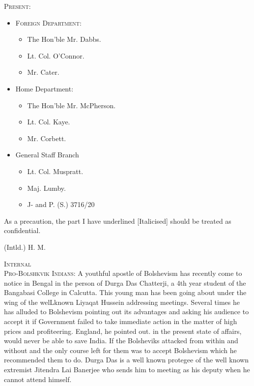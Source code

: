 \begin{center}
\textsc{Present:} 
\begin{itemize}
    
    \item \textsc{Foreign Department:}
    \begin{itemize}
     \item The Hon'ble Mr. Dabbs. 
     \item Lt. Col. O'Connor.
     \item Mr. Cater. 
    \end{itemize}
    

    
   \item  Home Department:
   \begin{itemize}
     \item The Hon’ble Mr. McPherson.
     \item Lt. Col. Kaye.
     \item Mr. Corbett. 
    \end{itemize}
    
    \item General Staff Branch
    \begin{itemize}
     \item Lt. Col. Muspratt. 
     \item Maj. Lumby. 
     \item J- and P. (S.) 3716/20 
    \end{itemize}
    
    \end{itemize}

\end{center}

As a precaution, the part I have underlined [Italicised] should be treated as confidential. 
\begin{flushright}
(Intld.) H. M. 
\end{flushright}
    
\textsc{Internal}\\

\textsc{Pro-Bolshkvik Indians:} A youthful apostle of Bolshevism has recently come to notice in Bengal in the person of Durga 
Das Chatterji, a 4th year student of the Bangabasi College in Calcutta. This young man has been going about under the wing of the welLknown Liyaqat Hussein addressing meetings. Several times he has alluded to Bolshevism pointing out its advantages and asking his audience to accept it if Government failed to take immediate action in the matter of high prices and profiteering. England, he pointed out. in the present state of affairs, would never be able to save India. If the Bolsheviks attacked from within and without and the only course left for them was to accept Bolshevism which he recommended them to do. Durga Das is a well known protegee of the well known extremist Jitendra Lai Banerjee who sends him to meeting as his deputy when he cannot attend himself. 

